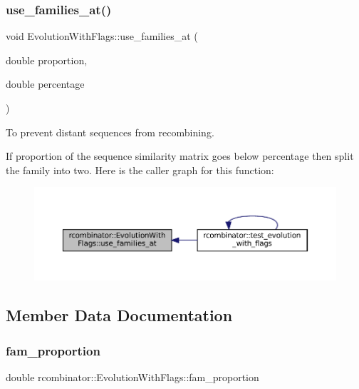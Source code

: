 \subsubsection{\texorpdfstring{use\+\_\+families\+\_\+at()}{use\_families\_at()}}
{\footnotesize\ttfamily void Evolution\+With\+Flags\+::use\+\_\+families\+\_\+at (\begin{DoxyParamCaption}\item[{double}]{proportion,  }\item[{double}]{percentage }\end{DoxyParamCaption})}



To prevent distant sequences from recombining. 

If {\ttfamily proportion} of the sequence similarity matrix goes below {\ttfamily percentage} then split the family into two. Here is the caller graph for this function\+:
\nopagebreak
\begin{figure}[H]
\begin{center}
\leavevmode
\includegraphics[width=350pt]{classrcombinator_1_1EvolutionWithFlags_ad94cabcb6a894d503c3d84c6022a1438_icgraph}
\end{center}
\end{figure}


\subsection{Member Data Documentation}
\mbox{\label{classrcombinator_1_1EvolutionWithFlags_a9548c1768894470bdf094f06be156fc1}} 
\subsubsection{\texorpdfstring{fam\+\_\+proportion}{fam\_proportion}}
{\footnotesize\ttfamily double rcombinator\+::\+Evolution\+With\+Flags\+::fam\+\_\+proportion\hspace{0.3cm}{\ttfamily [protected]}}



